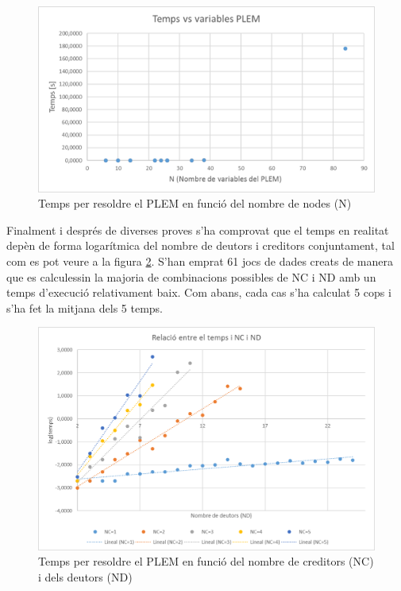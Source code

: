 \begin{figure}[ht]
\centering
\includegraphics[scale=0.8]{PLEM_temps_1.png}
\caption{Temps per resoldre el PLEM en funció del nombre de nodes (N)}\label{fig:PLEM_2}
\end{figure}

Finalment i després de diverses proves s'ha comprovat que el temps en realitat depèn de forma logarítmica del nombre de deutors i creditors conjuntament, tal com es pot veure a la figura \ref{fig:PLEM_3}. S'han emprat 61 jocs de dades creats de manera que es calculessin la majoria de combinacions possibles de NC i ND amb un temps d'execució relativament baix. Com abans, cada cas s'ha calculat 5 cops i s'ha fet la mitjana dels 5 temps.


\begin{figure}[ht]
\centering
\includegraphics[scale=0.8]{PLEM_temps_3.png}
\caption{Temps per resoldre el PLEM en funció del nombre de creditors (NC) i dels deutors (ND)}\label{fig:PLEM_3}
\end{figure}


